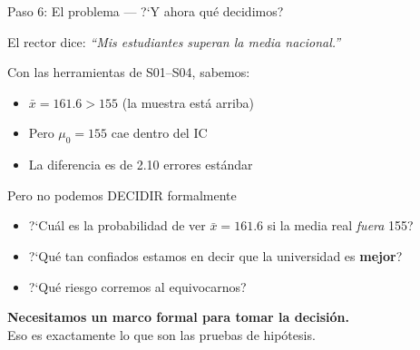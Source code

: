 \documentclass[aspectratio=169, 11pt]{beamer}
\begin{document}
\begin{frame}{Paso 6: El problema --- ?`Y ahora qu\'e decidimos?}
\small

El rector dice: \emph{``Mis estudiantes superan la media nacional.''}

\vspace{0.3cm}
Con las herramientas de S01--S04, sabemos:
\begin{itemize}\setlength{\itemsep}{2pt}
  \item[\checkmark] $\bar{x} = 161.6 > 155$ (la muestra est\'a arriba)
  \item[\checkmark] Pero $\mu_0 = 155$ cae dentro del IC
  \item[\checkmark] La diferencia es de 2.10 errores est\'andar
\end{itemize}

\vspace{0.3cm}
\begin{alertblock}{Pero no podemos DECIDIR formalmente}
\begin{itemize}\setlength{\itemsep}{2pt}
  \item ?`Cu\'al es la probabilidad de ver $\bar{x} = 161.6$ si la media real \emph{fuera} 155?
  \item ?`Qu\'e tan confiados estamos en decir que la universidad es \textbf{mejor}?
  \item ?`Qu\'e riesgo corremos al equivocarnos?
\end{itemize}
\end{alertblock}

\vspace{0.2cm}
\centering
\textbf{Necesitamos un marco formal para tomar la decisi\'on.}\\
Eso es exactamente lo que son las \alert{pruebas de hip\'otesis}.
\end{frame}
\end{document}
